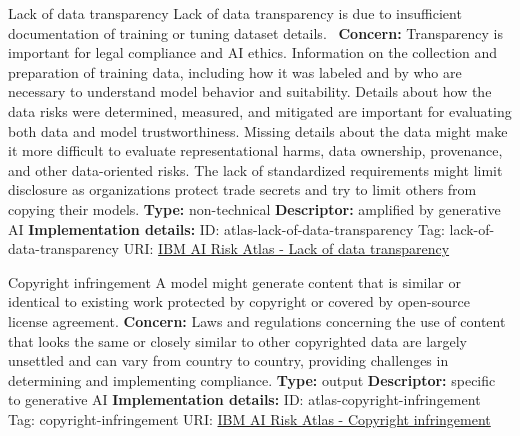 \begin{definitionbox}{Lack of data transparency}
Lack of data transparency is due to insufficient documentation of training or tuning dataset details. \newline\newline
\textbf{Concern: }Transparency is important for legal compliance and AI ethics. Information on the collection and preparation of training data, including how it was labeled and by who are necessary to understand model behavior and suitability. Details about how the data risks were determined, measured, and mitigated are important for evaluating both data and model trustworthiness. Missing details about the data might make it more difficult to evaluate representational harms, data ownership, provenance, and other data-oriented risks. The lack of standardized requirements might limit disclosure as organizations protect trade secrets and try to limit others from copying their models.\newline\newline
\textbf{Type: }non-technical\newline
\textbf{Descriptor: }amplified by generative AI \newline\newline
\textbf{Implementation details: } \newline
ID: atlas-lack-of-data-transparency \newline
Tag: lack-of-data-transparency \newline
URI:  \href{https://www.ibm.com/docs/en/watsonx/saas?topic=SSYOK8/wsj/ai-risk-atlas/lack-of-data-transparency.html}{IBM AI Risk Atlas - Lack of data transparency}\newline
\end{definitionbox}
\begin{definitionbox}{Copyright infringement}
A model might generate content that is similar or identical to existing work protected by copyright or covered by open-source license agreement.\newline\newline
\textbf{Concern: }Laws and regulations concerning the use of content that looks the same or closely similar to other copyrighted data are largely unsettled and can vary from country to country, providing challenges in determining and implementing compliance.\newline\newline
\textbf{Type: }output\newline
\textbf{Descriptor: }specific to generative AI \newline\newline
\textbf{Implementation details: } \newline
ID: atlas-copyright-infringement \newline
Tag: copyright-infringement \newline
URI:  \href{https://www.ibm.com/docs/en/watsonx/saas?topic=SSYOK8/wsj/ai-risk-atlas/copyright-infringement.html}{IBM AI Risk Atlas - Copyright infringement}\newline
\end{definitionbox}
